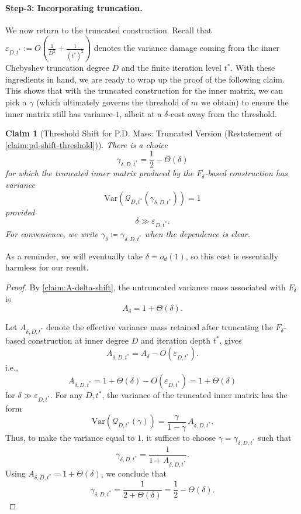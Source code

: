 \documentclass[12pt]{article}
\newcommand{\Var}{\mathrm{Var}}
\newtheorem{claim}[theorem]{Claim}
\newcommand{\calQ}{\mathcal{Q}}
\newcommand{\gam}{\gamma}
\begin{document}
\paragraph{Step-3: Incorporating truncation.}

We now return to the truncated construction. Recall that \(
    \varepsilon_{D,t^*}
    :=O(
    \frac{1}{D^2}+\frac{1}{(t^*)^2})
\)
denotes the variance damage coming from the inner Chebyshev truncation degree
\(D\) and the finite iteration level \(t^*\). With these ingredients in hand, we are ready to wrap up the proof of the following claim. This shows that with the truncated construction for the inner matrix, we can pick a $\gamma$ (which ultimately governs the threshold of $m$ we obtain) to ensure the inner matrix still has variance-$1$, albeit at a $\delta$-cost away from the threshold. 


\begin{claim}[Threshold Shift for P.D. Mass: Truncated Version (Restatement of \cref{claim:pd-shift-threshold})]
There is a choice
\[
  \gamma_{\delta,D,t^*}
    =
    \frac12-\Theta(\delta)
\]
for which the truncated inner matrix produced by the \(F_\delta\)-based
construction has variance
\[
    \Var\!\left(\calQ_{D,t^*}(\gamma_{\delta,D,t^*})\right)=1
\]
provided 
\[
    \delta\gg \varepsilon_{D,t^*}.
\]
For convenience, we write $\gam_\delta \coloneqq   \gamma_{\delta,D,t^*}$ when the dependence is clear.
\end{claim}
As a reminder, we will eventually take $\delta=o_d(1)$, so this cost is essentially harmless for our result.

\begin{proof}
By \cref{claim:A-delta-shift}, the untruncated variance mass associated with
\(F_\delta\) is
\[
    A_\delta=1+\Theta(\delta).
\]

Let \(A_{\delta,D,t^*}\) denote the effective variance mass retained after
truncating the \(F_\delta\)-based construction at inner degree \(D\) and
iteration depth \(t^*\).   gives
\[
    A_{\delta,D,t^*}
    =
    A_\delta - O(\varepsilon_{D,t^*}).
\]
i.e., \[
    A_{\delta,D,t^*}
    =
    1+\Theta(\delta) - O(\varepsilon_{D,t^*}) = 1+\Theta(\delta)
\]
for \(\delta\gg \varepsilon_{D,t^*}\).
For any \(D,t^*\), the variance of the truncated inner matrix has the form
\[
    \Var\!\left(\calQ_{D,t^*}(\gamma)\right)
    =
    \frac{\gamma}{1-\gamma}\,A_{\delta,D,t^*}.
\]
Thus, to make the variance equal to \(1\), it suffices to choose
\(\gamma=\gamma_{\delta,D,t^*}\) such that
\[
    \gamma_{\delta,D,t^*}
    =
    \frac{1}{1+A_{\delta,D,t^*}}.
\]
Using \(A_{\delta,D,t^*}=1+\Theta(\delta)\), we conclude that
\[
    \gamma_{\delta,D,t^*}
    =
    \frac{1}{2+\Theta(\delta)}
    =
    \frac12-\Theta(\delta).
\]
\end{proof}
\end{document}
